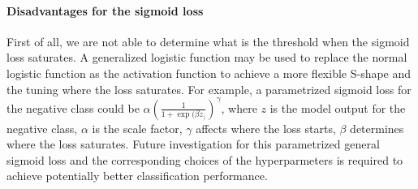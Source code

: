 %
%


\paragraph{Disadvantages for the sigmoid loss}

First of all, we are not able to determine what is the threshold when the sigmoid loss saturates.
A generalized logistic function may be used to replace the normal logistic function as the activation function to achieve a more flexible S-shape and the tuning where the loss saturates.
For example, a parametrized sigmoid loss for the negative class could be $\alpha (\frac{1}{1+\exp{(\beta z_)}})^{\gamma}$, where $z$ is the model output for the negative class, $\alpha$ is the scale factor, $\gamma$ affects where the loss starts, $\beta$ determines where the loss saturates.
Future investigation for this parametrized general sigmoid loss and the corresponding choices of the hyperparmeters is required to achieve potentially better classification performance.

